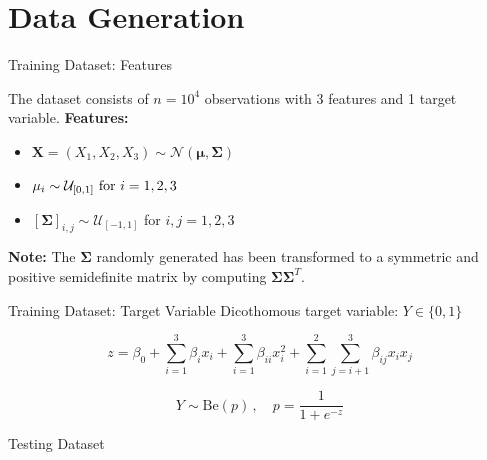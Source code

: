 \section{Data Generation}

\begin{frame}{Training Dataset: Features}

    The dataset consists of $n = 10^4$ observations with 3 features and 1 target variable. \vspace{0.3cm}
    \pause
    \textbf{Features:}
    \begin{itemize}
        \item $ \boldsymbol{X} = (X_1, X_2, X_3) \sim \mathcal{N}(\boldsymbol{\mu}, \boldsymbol{\Sigma}) $
        \item $ \mu_i \sim \mathcal{U}_{[0,1]} \) for \( i = 1, 2, 3 $
        \item $ [\boldsymbol{\Sigma}]_{i,j} \sim \mathcal{U}_{[-1,1]} $ for $ i, j = 1, 2, 3 $
    \end{itemize}

    \textbf{Note:} The $\boldsymbol{\Sigma}$ randomly generated has been transformed to a symmetric and positive semidefinite matrix by computing $\boldsymbol{\Sigma}\boldsymbol{\Sigma}^T$. 

\end{frame}

\begin{frame}{Training Dataset: Target Variable}
    Dicothomous target variable: $Y\in\{0,1\}$

    $$
        z = \beta_0 + \sum_{i=1}^3 \beta_i x_i + \sum_{i=1}^3 \beta_{ii} x_i^2 + \sum_{i=1}^{2} \sum_{j=i+1}^3 \beta_{ij} x_i x_j
    $$

    $$
        Y \sim \text{Be}(p)\,,\quad p = \frac{1}{1 + e^{-z}}
    $$
\end{frame}

\begin{frame}{Testing Dataset}
    
    
\end{frame}




